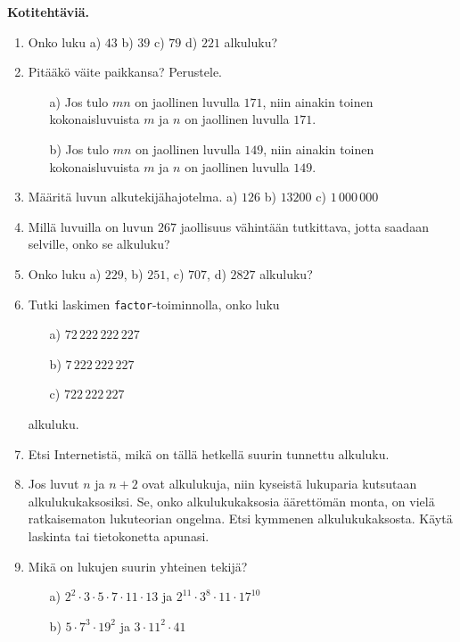 {\bf Kotitehtäviä.}

\begin{enumerate}

\item Onko luku a) $43$ b) $39$ c) $79$ d) $221$ alkuluku?

\item Pitääkö väite paikkansa? Perustele.
\begin{itemize}
\item[a)] Jos tulo $mn$ on jaollinen luvulla $171$, niin ainakin
toinen kokonaisluvuista $m$ ja $n$ on jaollinen luvulla $171$.

\item[b)] Jos tulo $mn$ on jaollinen luvulla $149$, niin ainakin
toinen kokonaisluvuista $m$ ja $n$ on jaollinen luvulla $149$.
\end{itemize}

\item Määritä luvun alkutekijähajotelma. a) $126$ b) $13200$ c)
$1\, 000\, 000$

\item Millä luvuilla on luvun $267$ jaollisuus vähintään
tutkittava, jotta saadaan selville, onko se alkuluku?

\item Onko luku a) $229$, b) $251$, c) $707$, d) $2827$ alkuluku?

\item Tutki laskimen {\tt factor}-toiminnolla, onko luku
\begin{itemize}
\item[a)] $72\,222\,222\,227$
\item[b)] $7\,222\,222\,227$
\item[c)] $722\,222\,227$
\end{itemize}
alkuluku.

\item Etsi Internetistä, mikä on tällä hetkellä suurin tunnettu
alkuluku.

\item
Jos luvut $n$ ja $n + 2$ ovat alkulukuja, niin kyseistä lukuparia
kutsutaan alkulukukaksosiksi. Se, onko alkulukukaksosia
äärettömän monta, on vielä ratkaisematon lukuteorian ongelma.
Etsi kymmenen alkulukukaksosta. Käytä laskinta tai tietokonetta
apunasi.

\item Mikä on lukujen suurin yhteinen tekijä?
\begin{itemize}
\item[a)] $2^2 \cdot 3 \cdot 5 \cdot 7 \cdot 11 \cdot 13$ ja
$2^{11} \cdot 3^8 \cdot 11 \cdot 17^{10}$
\item[b)] $5 \cdot 7^3 \cdot 19^2$ ja $3 \cdot 11^2 \cdot 41$
\end{itemize}


\end{enumerate}
